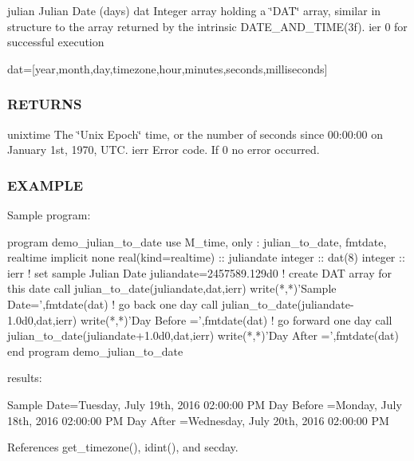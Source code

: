 \begin{DoxyVerb}
julian Julian Date (days) dat Integer array holding a \char`\"{}\+D\+A\+T\char`\"{} array, similar in structure to the array returned by the intrinsic D\+A\+T\+E\+\_\+\+A\+N\+D\+\_\+\+T\+I\+M\+E(3f). ier 0 for successful execution \begin{DoxyVerb}      dat=[year,month,day,timezone,hour,minutes,seconds,milliseconds]
\end{DoxyVerb}
 \subsubsection*{R\+E\+T\+U\+R\+NS}

unixtime The \char`\"{}\+Unix Epoch\char`\"{} time, or the number of seconds since 00\+:00\+:00 on January 1st, 1970, U\+TC. ierr Error code. If 0 no error occurred.

\subsubsection*{E\+X\+A\+M\+P\+LE}

\begin{DoxyVerb}Sample program:

 program demo_julian_to_date
 use M_time, only : julian_to_date, fmtdate, realtime
 implicit none
 real(kind=realtime)     :: juliandate
 integer                 :: dat(8)
 integer                 :: ierr
    ! set sample Julian Date
    juliandate=2457589.129d0
    ! create DAT array for this date
    call julian_to_date(juliandate,dat,ierr)
    write(*,*)'Sample Date=',fmtdate(dat)
    ! go back one day
    call julian_to_date(juliandate-1.0d0,dat,ierr)
    write(*,*)'Day Before =',fmtdate(dat)
    ! go forward one day
    call julian_to_date(juliandate+1.0d0,dat,ierr)
    write(*,*)'Day After  =',fmtdate(dat)
 end program demo_julian_to_date

results:

 Sample Date=Tuesday, July 19th, 2016 02:00:00 PM
 Day Before =Monday, July 18th, 2016 02:00:00 PM
 Day After  =Wednesday, July 20th, 2016 02:00:00 PM \end{DoxyVerb}
 

References get\+\_\+timezone(), idint(), and secday.


\end{DoxyVerb}
